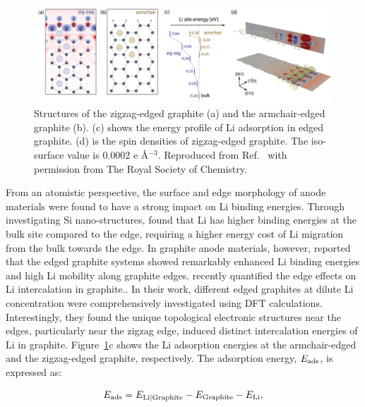 \documentclass[../main.tex]{subfiles}
\begin{document}
\begin{figure}
    \centering
    \includegraphics[scale=0.6]{figures/Intercalation energies.PNG}
    \caption{Structures of the zigzag-edged graphite (a) and the armchair-edged graphite (b). (c) shows the energy profile of Li adsorption in edged graphite. (d) is the spin densities of zigzag-edged graphite. The iso-surface value is 0.0002 e \AA$^{-3}$. Reproduced from Ref.~ with permission from The Royal Society of Chemistry.}
    \label{fig:arm_zig}
\end{figure}

From an atomistic perspective, the surface and edge morphology of anode materials were found to have a strong impact on Li binding energies.\cite{uthaisar2010edge,leggesse2016lithium} Through investigating Si nano-structures, \citeauthor{chan2010controlling} found that Li has higher binding energies at the bulk site compared to the edge, requiring a higher energy cost of Li migration from the bulk towards the edge.\cite{chan2010controlling} In graphite anode materials, however, \citeauthor{leggesse2016lithium} reported that the edged graphite systems showed remarkably enhanced Li binding energies and high Li mobility along graphite edges.\cite{leggesse2016lithium} \citeauthor{peng2020lithium} recently quantified the edge effects on Li intercalation in graphite.\cite{peng2020lithium}. In their work, different edged graphites at dilute Li concentration were comprehensively investigated using DFT calculations. Interestingly, they found the unique topological electronic structures near the edges, particularly near the zigzag edge, induced distinct intercalation energies of Li in graphite. Figure~\ref{fig:arm_zig}c shows the Li adsorption energies at the armchair-edged and the zigzag-edged graphite, respectively. The adsorption energy, $E_{\rm{ads}}$, is expressed as:

\begin{equation}
    E_{\rm{ads}} = E_{\rm{Li|Graphite}}-E_{\rm{Graphite}}-E_{\rm{Li}},
    \label{eq:adsorption_energy}
\end{equation}
\end{document}
